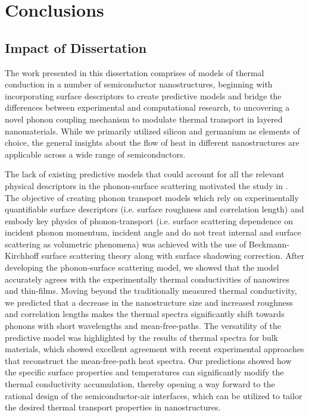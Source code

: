 \chapter{Conclusions}
\label{chap:conc}
\section{Impact of Dissertation}
The work presented in this dissertation comprises of models of thermal conduction in a number of semiconductor nanostructures, beginning with incorporating surface descriptors to create predictive models and bridge the differences between experimental and computational research, to uncovering a novel phonon coupling mechanism to modulate thermal transport in layered nanomaterials. While we primarily utilized silicon and germanium as elements of choice, the general insights about the flow of heat in different nanostructures are applicable across a wide range of semiconductors. 

\par The lack of existing predictive models that could account for all the relevant physical descriptors in the phonon-surface scattering motivated the study in . The objective of creating phonon transport models which rely on experimentally quantifiable surface descriptors (i.e. surface roughness and correlation length) and embody key physics of phonon-transport (i.e. surface scattering dependence on incident phonon momentum, incident angle and do not treat internal and surface scattering as volumetric phenomena) was achieved with the use of Beckmann-Kirchhoff surface scattering theory along with surface shadowing correction. After developing the phonon-surface scattering model, we showed that the model accurately agrees with the experimentally thermal conductivities of nanowires and thin-films. Moving beyond the traditionally measured thermal conductivity, we predicted that a decrease in the nanostructure size and increased roughness and correlation lengths makes the thermal spectra significantly shift towards phonons with short wavelengths and mean-free-paths. The versatility of the predictive model was highlighted by the results of thermal spectra for bulk materials, which showed excellent agreement with recent experimental approaches that reconstruct the mean-free-path heat spectra. Our predictions showed how the specific surface properties and temperatures can significantly modify the thermal conductivity accumulation, thereby opening a way forward to the rational design of the semiconductor-air interfaces, which can be utilized to tailor the desired thermal transport properties in nanostructures. 

